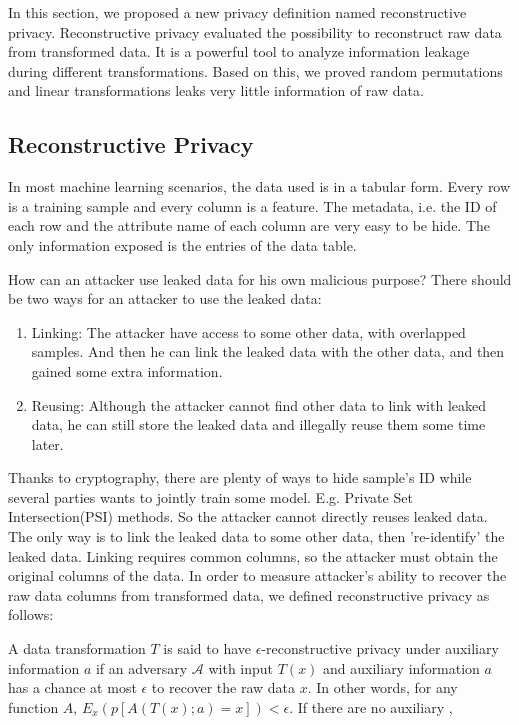 In this section, we proposed a new privacy definition named reconstructive privacy. Reconstructive privacy evaluated the possibility to reconstruct raw data from transformed data. It is a powerful tool to analyze information leakage during different transformations. Based on this, we proved random permutations and linear transformations leaks very little information of raw data.
\subsection{Reconstructive Privacy}
In most machine learning scenarios, the data used is in a tabular form. Every row is a training sample and every column is a feature. The metadata, i.e. the ID of each row and the attribute name of each column are very easy to be hide. The only information exposed is the entries of the data table. 

How can an attacker use leaked data for his own malicious purpose? There should be two ways for an attacker to use the leaked data:
\begin{enumerate}
    \item Linking: The attacker have access to some other data, with overlapped samples. And then he can link the leaked data with the other data, and then gained some extra information.
    \item Reusing: Although the attacker cannot find other data to link with leaked data, he can still store the leaked data and illegally reuse them some time later.
\end{enumerate}

Thanks to cryptography, there are plenty of ways to hide sample's ID while several parties wants to jointly train some model. E.g. Private Set Intersection(PSI) methods. So the attacker cannot directly reuses leaked data. The only way is to link the leaked data to some other data, then 're-identify' the leaked data. Linking requires common columns, so the attacker must obtain the original columns of the data. In order to measure attacker's ability to recover the raw data columns from transformed data, we defined reconstructive privacy as follows:

\begin{definition}
    A data transformation $T$ is said to have $\epsilon$-reconstructive privacy under auxiliary information $a$ if an adversary $\mathcal A$ with input $T(x)$ and auxiliary information $a$ has a chance at most $\epsilon$ to recover the raw data $x$.
    In other words, for any function $A$, $E_x(p[A(T(x); a) = x]) < \epsilon$. If there are no auxiliary , 
\end{definition}

